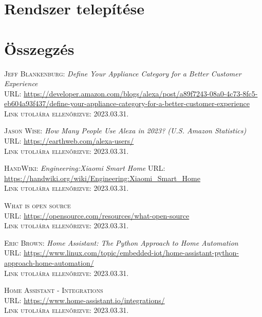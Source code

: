 \documentclass[
]{thesis-ekf}
\theoremstyle{definition}
\theoremstyle{remark}
\begin{document}
	\chapter{Rendszer telepítése}

	
	\chapter*{Összegzés}
	
	\begin{thebibliography}{20}
		
		\textsc{Jeff Blankenburg}: \emph{Define Your Appliance Category for a Better Customer Experience}\\
		\textsc{URL:}%
		 \url{https://developer.amazon.com/blogs/alexa/post/a89f7243-08a0-4c73-8fc5-eb604a93f437/define-your-appliance-category-for-a-better-customer-experience}\\
		\textsc{Link utoljára ellenőrizve:} 2023.03.31.
		
		\textsc{Jason Wise}: \emph{How Many People Use Alexa in 2023? (U.S. Amazon Statistics)} \\
		\textsc{URL:} \url{https://earthweb.com/alexa-users/}\\
		\textsc{Link utoljára ellenőrizve:} 2023.03.31.
		
		\textsc{HandWiki}: \emph{Engineering:Xiaomi Smart Home}
		\textsc{URL:} \url{https://handwiki.org/wiki/Engineering:Xiaomi_Smart_Home}\\
		\textsc{Link utoljára ellenőrizve:} 2023.03.31.
		
		\textsc{What is open source}\\
		\textsc{URL:} \url{https://opensource.com/resources/what-open-source}\\
		\textsc{Link utoljára ellenőrizve:} 2023.03.31.
		
		\textsc{Eric Brown}: \emph{Home Assistant: The Python Approach to Home Automation}\\
		\textsc{URL:} \url{https://www.linux.com/topic/embedded-iot/home-assistant-python-approach-home-automation/}\\
		\textsc{Link utoljára ellenőrizve:} 2023.03.31.
		
		\textsc{Home Assistant - Integrations}\\
		\textsc{URL:} \url{https://www.home-assistant.io/integrations/}\\
		\textsc{Link utoljára ellenőrizve:} 2023.03.31.
		

\end{thebibliography}
\end{document}
